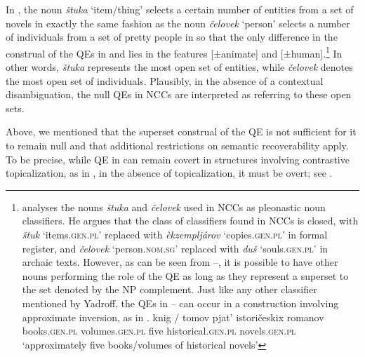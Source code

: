 \documentclass[output=paper,
modfonts,
newtxmath,
hidelinks
]{langscibook}
\begin{document}
\noindent In , the noun \textit{štuka} ‘item/thing’ selects a certain number of entities from a set of novels in exactly the same fashion as the noun \textit{čelovek} ‘person’ selects a number of individuals from a set of pretty people in  so that the only difference in the construal of the QEs in  and  lies in the features [$\pm$animate] and [$\pm$human].\footnote{\label{fn23}\citet{Yadroff1999} analyses the nouns \textit{štuka} and \textit{čelovek} used in NCCs as pleonastic noun classifiers. He argues that the class of classifiers found in NCCs is closed, with \textit{štuk} ‘items\textsc{.gen.pl’} replaced with \textit{èkzempljárov} ‘copies\textsc{.gen.pl’} in formal register, and \textit{čelovek} ‘person.\textsc{nom.sg’} replaced with \textit{duš} ‘souls\textsc{.gen.pl’} in archaic texts. However, as can be seen from --, it is possible to have other nouns performing the role of the QE as long as they represent a superset to the set denoted by the NP complement. Just like any other classifier mentioned by Yadroff, the QEs in -- can occur in a construction involving approximate inversion, as in .  
\ea \label{fn23i}
\gll knig / tomov    pjat’   istoričeskix   romanov  \\
 	 books.\textsc{gen.pl} {} volumes.\textsc{gen.pl} five  historical.\textsc{gen.pl}   novels.\textsc{gen.pl}  \\
\glt `approximately five books/volumes of historical novels'
\z
} 
In other words, \textit{štuka} represents the most open set of entities, while \textit{čelovek} denotes the most open set of individuals. Plausibly, in the absence of a contextual disambiguation, the null QEs in NCCs are interpreted as referring to these open sets.

Above, we mentioned that the superset construal of the QE is not sufficient for it to remain null and that additional restrictions on semantic recoverability apply. To be precise, while QE in  can remain covert in structures involving contrastive topicalization, as in , in the absence of topicalization, it must be overt; see . 
\ea \label{ex34}
	\z
    
\end{document}
